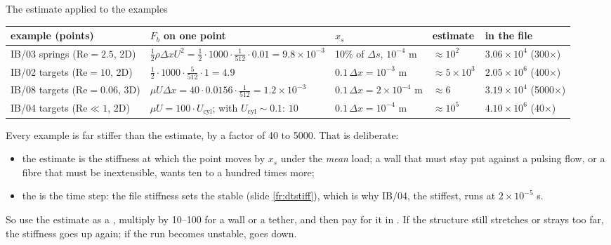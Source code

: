 \documentclass[aspectratio=169,11pt]{beamer}
\begin{document}
\begin{frame}{The estimate applied to the examples}
\label{fr:kspring2}
\scriptsize
\setlength{\tabcolsep}{3pt}\renewcommand{\arraystretch}{0.97}
\begin{tabular}{@{}L{0.16\textwidth}L{0.3\textwidth}L{0.14\textwidth}L{0.1\textwidth}L{0.2\textwidth}@{}}
\toprule
example (points) & $F_b$ on one point & $x_s$ & estimate & in the file\\
\midrule
IB/03 springs ($\mathrm{Re} = 2.5$, 2D) & $\frac12\rho\Delta x U^2 = \frac12\cdot1000\cdot\frac{1}{512}\cdot0.01 = 9.8\times10^{-3}$ & 10\% of $\Delta s$, $10^{-4}$ m & $\approx 10^2$ & $3.06\times10^4$ (300$\times$)\\
IB/02 targets ($\mathrm{Re} = 10$, 2D) & $\frac12\cdot1000\cdot\frac{5}{512}\cdot1 = 4.9$ & $0.1\,\Delta x = 10^{-3}$ m & $\approx 5\times10^3$ & $2.05\times10^6$ (400$\times$)\\
IB/08 targets ($\mathrm{Re} = 0.06$, 3D) & $\mu U \Delta x = 40\cdot0.0156\cdot\frac{1}{512} = 1.2\times10^{-3}$ & $0.1\,\Delta x = 2\times10^{-4}$ m & $\approx 6$ & $3.19\times10^4$ (5000$\times$)\\
IB/04 targets ($\mathrm{Re} \ll 1$, 2D) & $\mu U = 100\cdot U_{\mathrm{cyl}}$; with $U_{\mathrm{cyl}} \sim 0.1$: $10$ & $0.1\,\Delta x = 10^{-4}$ m & $\approx 10^5$ & $4.10\times10^6$ (40$\times$)\\
\bottomrule
\end{tabular}

\vspace{2mm}
\small Every example is far stiffer than the estimate, by a factor of 40 to 5000. That is deliberate:
\begin{itemize}
  \item the estimate is the stiffness at which the point moves by $x_s$ under the \emph{mean} load; a wall that must stay put against a pulsing flow, or a fibre that must be inextensible, wants ten to a hundred times more;
  \item the  is the time step: the file stiffness sets the stable  (slide \ref{fr:dtstiff}), which is why IB/04, the stiffest, runs at $2\times10^{-5}$ s.
\end{itemize}
\small So use the estimate as a , multiply by 10--100 for a wall or a tether, and then pay for it in . If the structure still stretches or strays too far, the stiffness goes up again; if the run becomes unstable,  goes down.
\end{frame}
\end{document}
